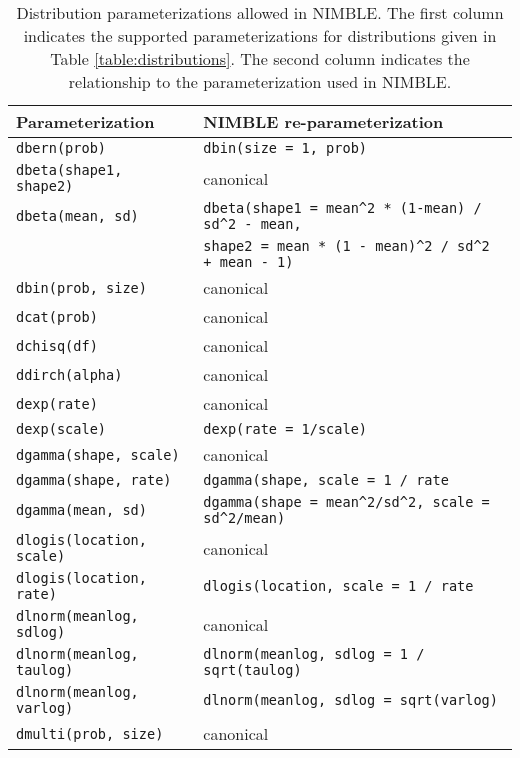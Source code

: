   \begin{center}
    \begin{longtable}{ll}

  \caption{Distribution parameterizations allowed in NIMBLE. The first
    column indicates the supported parameterizations for
    distributions given in Table \ref{table:distributions}. The second column indicates the
    relationship to the  parameterization used in
    NIMBLE. } \label{table:distributions-alternates}\\
      \hline
      Parameterization & NIMBLE re-parameterization \\
      \hline \hline
\endhead
   \texttt{dbern(prob)} & \texttt{dbin(size = 1, prob)} \\
      \texttt{dbeta(shape1, shape2)} & canonical \\
      \texttt{dbeta(mean, sd)} & \verb|dbeta(shape1 = mean^2 * (1-mean) / sd^2 - mean,| \\
      & \verb|shape2 = mean * (1 - mean)^2 / sd^2 + mean - 1)| \\
   \texttt{dbin(prob, size)} & canonical \\
         \texttt{dcat(prob)} & canonical \\
         \texttt{dchisq(df)} & canonical \\
         \texttt{ddirch(alpha)} & canonical \\
      \texttt{dexp(rate)} & canonical \\
       \texttt{dexp(scale)} & \texttt{dexp(rate = 1/scale)} \\
     \texttt{dgamma(shape, scale)} & canonical \\
      \texttt{dgamma(shape, rate)} & \verb|dgamma(shape, scale = 1 / rate| \\
      \texttt{dgamma(mean, sd)} & \verb|dgamma(shape = mean^2/sd^2, scale = sd^2/mean)| \\
     \texttt{dlogis(location, scale)} & canonical \\
     \texttt{dlogis(location, rate)} & \verb|dlogis(location, scale = 1 / rate| \\
     \texttt{dlnorm(meanlog, sdlog)} & canonical \\
     \texttt{dlnorm(meanlog, taulog)} & \verb|dlnorm(meanlog, sdlog = 1 / sqrt(taulog)| \\
     \texttt{dlnorm(meanlog, varlog)} & \verb|dlnorm(meanlog, sdlog = sqrt(varlog)| \\
     \texttt{dmulti(prob, size)} & canonical \\

\end{longtable}
\end{center}
